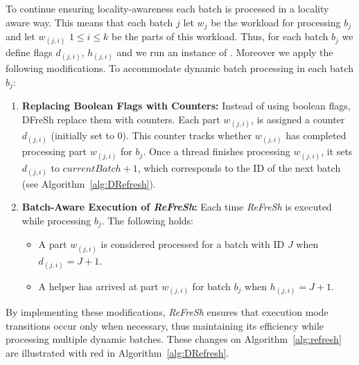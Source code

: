 To continue ensuring locality-awareness each batch is processed in a locality aware way. This means 
that each batch $j$ let $w_j$ be the workload for processing $b_j$ and let $w_(j,i)$ 
$1 \leq i \leq k$ be the parts of this workload. Thus, for each batch $b_j$ we define 
flags $d_(j,i)$, $h_(j,i)$ and we run an instance of \Refresh. Moreover we apply the following
modifications.
\newline To accommodate dynamic batch processing in each batch $b_j$:

\begin{enumerate}  
    \item \textbf{Replacing Boolean Flags with Counters:}  
    Instead of using boolean flags, DFreSh replace them with counters. Each part $w_(j,i)$,
    is assigned a counter $d_(j,i)$ (initially set to 0). This counter tracks whether $w_(j,i)$ has
    completed processing part $w_(j,i)$ for $b_j$. Once a thread finishes processing $w_(j,i)$, it
    sets $d_(j,i)$ to $\mathit{currentBatch} + 1$, which corresponds to the ID of the next
    batch (see Algorithm~\ref{alg:DRefresh}).  

    \item \textbf{Batch-Aware Execution of \textit{ReFreSh}:}  
    Each time \textit{ReFreSh} is executed while processing $b_j$. The following holds:
    \begin{itemize}  
        \item A part $w_(j,i)$ is considered processed for a batch with ID $J$ when $d_(j,i) = J + 1$.  
        \item A helper has arrived at part $w_(j,i)$ for batch $b_j$ when $h_(j,i) = J + 1$.  
    \end{itemize}  
\end{enumerate}  
% 
By implementing these modifications, \textit{ReFreSh}  ensures that execution mode transitions 
occur only when necessary, thus maintaining its efficiency while processing multiple dynamic batches.
These changes on Algorithm~\ref{alg:refresh} are illustrated with red in Algorithm~\ref{alg:DRefresh}.


